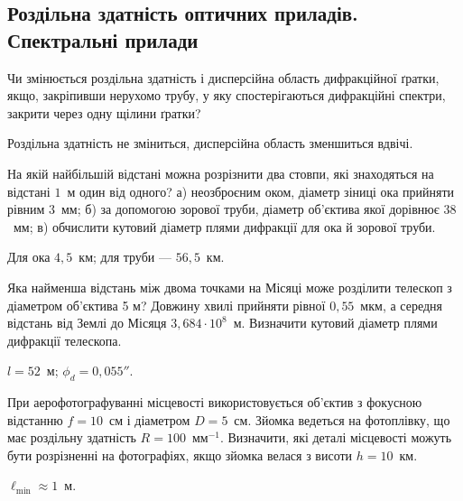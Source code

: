 \subsection*{Роздільна здатність оптичних приладів. Спектральні прилади}


\begin{problem}%
    Чи змінюється роздільна здатність і дисперсійна область дифракційної
    ґратки, якщо, закріпивши нерухомо трубу, у яку спостерігаються
    дифракційні спектри, закрити через одну щілини ґратки?
    \begin{solution}
        Роздільна здатність не зміниться, дисперсійна область зменшиться вдвічі.
    \end{solution}
\end{problem}


\begin{problem}%
    На якій найбільшій відстані можна розрізнити два стовпи, які знаходяться на відстані $ 1 $~м один від одного? а) неозброєним оком, діаметр зіниці ока прийняти рівним $ 3 $~мм; б) за допомогою зорової труби, діаметр об'єктива якої дорівнює $ 38 $~мм; в) обчислити кутовий діаметр плями дифракції для ока й зорової труби.
    \begin{solution}
        Для ока $4,5$~км; для труби --- $56,5$~км.
    \end{solution}
\end{problem}


\begin{problem}%
    Яка найменша відстань між двома точками на Місяці може розділити
    телескоп з діаметром об'єктива 5 м? Довжину хвилі прийняти рівної
    $ 0,55 $~мкм, а середня відстань від Землі до Місяця $ 3,684\cdot10^8 $~м. Визначити кутовий діаметр плями дифракції телескопа.
    \begin{solution}
        $l = 52$~м; $\phi_d = 0,055''$.
    \end{solution}
\end{problem}


\begin{problem}%
    При аерофотографуванні місцевості використовується об'єктив з фокусною відстанню $ f = 10 $~см і діаметром $ D = 5 $~см. Зйомка ведеться на фотоплівку, що має роздільну здатність $ R = 100 $~мм$^{-1}$. Визначити, які деталі місцевості можуть бути розрізненні на фотографіях, якщо зйомка велася з висоти $ h = 10 $~км.
    \begin{solution}
        $\ell_{\min}\approx 1$~м.
    \end{solution}
\end{problem}


